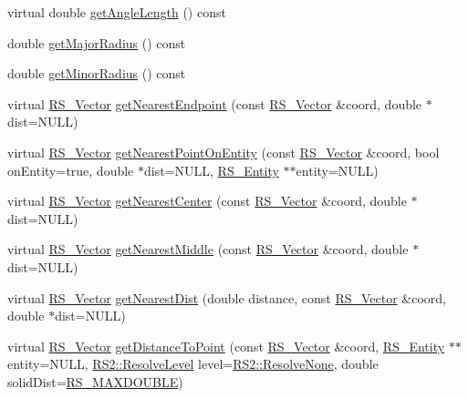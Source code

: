 \begin{DoxyCompactItemize}
virtual double \hyperlink{class_r_s___ellipse_a2718a712a818603842cc08f7307ceb0c}{get\-Angle\-Length} () const 
\item 
double \hyperlink{class_r_s___ellipse_abf6b1d63eab920fe4b2609056c92adde}{get\-Major\-Radius} () const 
\item 
double \hyperlink{class_r_s___ellipse_afc81f48c4fd9dd99325913d2519f2c4a}{get\-Minor\-Radius} () const 
\item 
virtual \hyperlink{class_r_s___vector}{R\-S\-\_\-\-Vector} \hyperlink{class_r_s___ellipse_a1886006eafb442865c43f217c206faa6}{get\-Nearest\-Endpoint} (const \hyperlink{class_r_s___vector}{R\-S\-\_\-\-Vector} \&coord, double $\ast$dist=N\-U\-L\-L)
\item 
virtual \hyperlink{class_r_s___vector}{R\-S\-\_\-\-Vector} \hyperlink{class_r_s___ellipse_ab82a148fec907c7cae7488365aa14847}{get\-Nearest\-Point\-On\-Entity} (const \hyperlink{class_r_s___vector}{R\-S\-\_\-\-Vector} \&coord, bool on\-Entity=true, double $\ast$dist=N\-U\-L\-L, \hyperlink{class_r_s___entity}{R\-S\-\_\-\-Entity} $\ast$$\ast$entity=N\-U\-L\-L)
\item 
virtual \hyperlink{class_r_s___vector}{R\-S\-\_\-\-Vector} \hyperlink{class_r_s___ellipse_a9f3a86b6a13a0058018ab3d847f33536}{get\-Nearest\-Center} (const \hyperlink{class_r_s___vector}{R\-S\-\_\-\-Vector} \&coord, double $\ast$dist=N\-U\-L\-L)
\item 
virtual \hyperlink{class_r_s___vector}{R\-S\-\_\-\-Vector} \hyperlink{class_r_s___ellipse_af0e0bb016d3ea6bed3b7a3978881652d}{get\-Nearest\-Middle} (const \hyperlink{class_r_s___vector}{R\-S\-\_\-\-Vector} \&coord, double $\ast$dist=N\-U\-L\-L)
\item 
virtual \hyperlink{class_r_s___vector}{R\-S\-\_\-\-Vector} \hyperlink{class_r_s___ellipse_ac331ca783a331c58ae0a9f61d45b9200}{get\-Nearest\-Dist} (double distance, const \hyperlink{class_r_s___vector}{R\-S\-\_\-\-Vector} \&coord, double $\ast$dist=N\-U\-L\-L)
\item 
virtual \hyperlink{class_r_s___vector}{R\-S\-\_\-\-Vector} \hyperlink{class_r_s___ellipse_a6d2af1444686c2d253249156e8f5bddd}{get\-Distance\-To\-Point} (const \hyperlink{class_r_s___vector}{R\-S\-\_\-\-Vector} \&coord, \hyperlink{class_r_s___entity}{R\-S\-\_\-\-Entity} $\ast$$\ast$entity=N\-U\-L\-L, \hyperlink{class_r_s2_a1b2c5e3a3e9d1b03a9564229255faa20}{R\-S2\-::\-Resolve\-Level} level=\hyperlink{class_r_s2_a1b2c5e3a3e9d1b03a9564229255faa20aecb7396f39bc313ad8903c8a5fac5a50}{R\-S2\-::\-Resolve\-None}, double solid\-Dist=\hyperlink{rs_8h_af2eae5be828690688d84f5f7a6c0c7f2}{R\-S\-\_\-\-M\-A\-X\-D\-O\-U\-B\-L\-E})

\end{DoxyCompactItemize}
